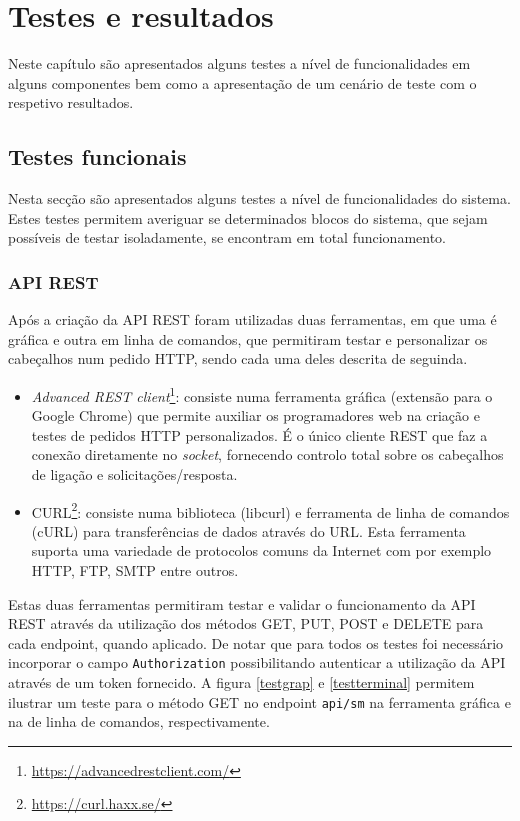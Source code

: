 \chapter{Testes e resultados}

Neste capítulo são apresentados alguns testes a nível de funcionalidades em alguns componentes bem como a apresentação de um cenário de teste com o respetivo resultados. 




\section{Testes funcionais}


Nesta secção são apresentados alguns testes a nível de funcionalidades do sistema. Estes testes permitem averiguar se determinados blocos do sistema, que sejam possíveis de testar isoladamente, se encontram em total funcionamento. 

\subsection{API REST}


Após a criação da API REST foram utilizadas duas ferramentas, em que uma é gráfica e outra em linha de comandos, que permitiram testar e personalizar os cabeçalhos num pedido HTTP, sendo cada uma deles descrita de seguinda.


\begin{itemize}
	\item \textit{Advanced REST client}\footnote{\url{https://advancedrestclient.com/}}: consiste numa ferramenta gráfica (extensão para o Google Chrome) que permite auxiliar os programadores web na criação e testes de pedidos \ac{HTTP} personalizados. É o único cliente \ac{REST} que faz a conexão diretamente no \textit{socket}, fornecendo controlo total sobre os cabeçalhos de ligação e solicitações/resposta.
	 
	\item CURL\footnote{\url{https://curl.haxx.se/}}: consiste numa biblioteca (libcurl) e ferramenta de linha de comandos (cURL) para transferências de dados através do \ac{URL}. Esta ferramenta suporta uma variedade de protocolos comuns da Internet com por exemplo \ac{HTTP}, \ac{FTP}, \ac{SMTP} entre outros. 
\end{itemize}


Estas duas ferramentas permitiram testar e validar o funcionamento da API REST através da utilização dos métodos GET, PUT, POST e DELETE para cada endpoint, quando aplicado. De notar que para todos os testes foi necessário incorporar o campo \texttt{Authorization} possibilitando autenticar a utilização da API através de um token fornecido. A figura \ref{testgrap} e \ref{testterminal} permitem ilustrar um teste para o método GET no endpoint \texttt{api/sm} na ferramenta gráfica e na de linha de comandos, respectivamente. 







